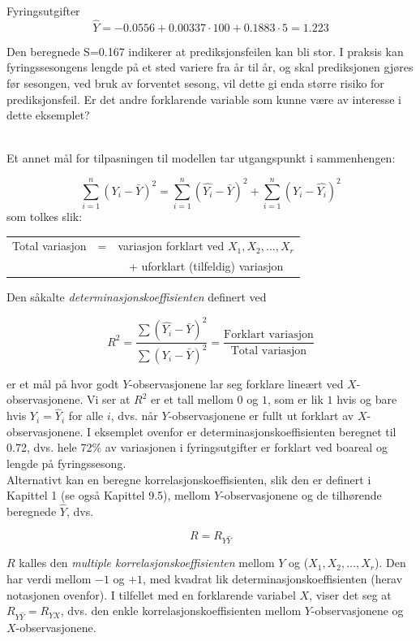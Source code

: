 \begin{eksempel}{Fyringsutgifter}
\[ \hat{Y}=-0.0556+0.00337\cdot 100+0.1883\cdot 5=1.223 \]

\noindent Den beregnede S=0.167 indikerer at prediksjonsfeilen kan bli stor.
I praksis kan fyringssesongens lengde på et sted variere fra år til
 år, og skal prediksjonen gjøres før sesongen, ved bruk av forventet
 sesong, vil dette gi enda større risiko for prediksjonsfeil. Er det andre
 forklarende variable som kunne være av interesse i dette eksemplet?
\end{eksempel} \\


Et annet mål for tilpasningen til modellen tar utgangspunkt i sammenhengen:

\[ \sum_{i=1}^{n}{(Y_i-\bar{Y})}^2=\sum_{i=1}^{n}{(\hat{Y_i}-\bar{Y})}^2+
                              \sum_{i=1}^{n}{(Y_i-\hat{Y_i})}^2   \]
\noindent som tolkes slik:
\begin{center}
\begin{tabular}{ccc}
Total variasjon &=&variasjon forklart ved $X_1, X_2, \ldots, X_r$ \\
                & &+ uforklart (tilfeldig) variasjon
\end{tabular}
\end{center}
Den såkalte {\em determinasjonskoeffisienten} definert ved

\[ R^2=\frac{\sum{(\hat{Y_i}-\bar{Y})}^2}{\sum{(Y_i-\bar{Y})}^2}=  
              \frac{\mbox{Forklart variasjon}}{\mbox{Total variasjon}} \]

\noindent er et mål  på hvor godt $Y$-observasjonene lar seg
forklare lineært ved $X$-observasjonene. 
Vi ser at $R^2$ er et tall mellom $0$ og $1$, som er lik $1$ hvis og
bare hvis $Y_i ={\hat{Y}}_i$ for alle $i$, dvs. når $Y$-observasjonene er
fullt ut forklart av $X$-observasjonene. I eksemplet ovenfor er
determinasjonskoeffisienten beregnet til 0.72, dvs. hele 72\% av variasjonen
i fyringsutgifter er forklart ved boareal og lengde på fyringssesong.\\

  Alternativt kan en beregne 
korrelasjonskoeffisienten, slik den er definert i Kapittel 1 (se også
Kapittel 9.5), mellom $Y$-observasjonene og de tilhørende beregnede 
$\hat{Y}$, dvs.

\[   R=R_{Y\hat{Y}}    \]

\noindent $R$ kalles den {\em multiple korrelasjonskoeffisienten} mellom $Y$ 
og ($X_1, X_2, \ldots, X_r$).  Den har verdi mellom $-1 $ og $+1$, med kvadrat
lik determinasjonskoeffisienten (herav notasjonen ovenfor).  I tilfellet
med en forklarende variabel $X$, viser det seg at $R_{Y\hat{Y}}=R_{YX}$,
dvs. den enkle
korrelasjonskoeffisienten mellom $Y$-observasjonene og $X$-observasjonene.

